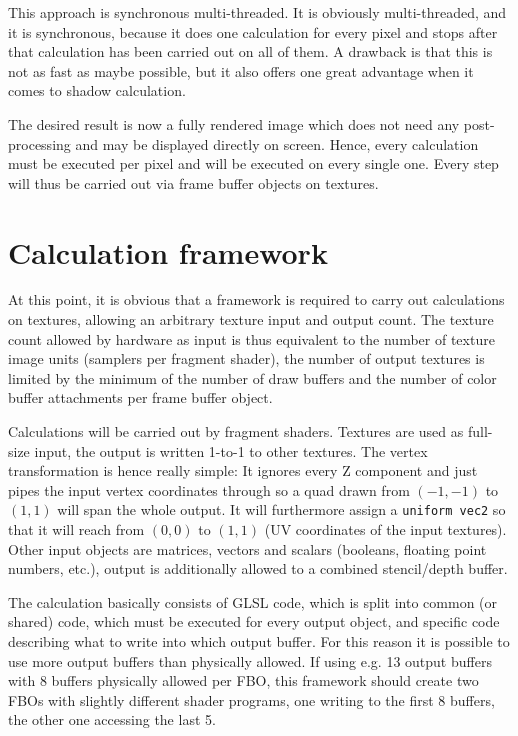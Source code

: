 \documentclass[english,fleqn,10pt,twocolumn]{article}
\begin{document}
This approach is synchronous multi-threaded. It is obviously multi-threaded, and it is synchronous, because it does one calculation for every pixel and stops after that calculation has been carried out on all of them. A drawback is
that this is not as fast as maybe possible, but it also offers one great advantage when it comes to shadow calculation.

The desired result is now a fully rendered image which does not need any post-processing and may be displayed directly on screen. Hence, every calculation must be executed per pixel and will be executed on every single one.
Every step will thus be carried out via frame buffer objects on textures.


\section{Calculation framework}

At this point, it is obvious that a framework is required to carry out calculations on textures, allowing an arbitrary texture input and output count. The texture count allowed by hardware as input is thus equivalent to the number of
texture image units (samplers per fragment shader), the number of output textures is limited by the minimum of the number of draw buffers and the number of color buffer attachments per frame buffer object.

Calculations will be carried out by fragment shaders. Textures are used as full-size input, the output is written 1-to-1 to other textures. The vertex transformation is hence really simple: It ignores every Z component and just pipes
the input vertex coordinates through so a quad drawn from $(-1, -1)$ to $(1, 1)$ will span the whole output. It will furthermore assign a {\tt uniform vec2} so that it will reach from $(0, 0)$ to $(1, 1)$ (UV coordinates of the input
textures). Other input objects are matrices, vectors and scalars (booleans, floating point numbers, etc.), output is additionally allowed to a combined stencil/depth buffer.

The calculation basically consists of GLSL code, which is split into common (or shared) code, which must be executed for every output object, and specific code describing what to write into which output buffer. For this reason it is
possible to use more output buffers than physically allowed. If using e.g. 13 output buffers with 8 buffers physically allowed per FBO, this framework should create two FBOs with slightly different shader programs, one writing to the
first 8 buffers, the other one accessing the last 5.
\end{document}
